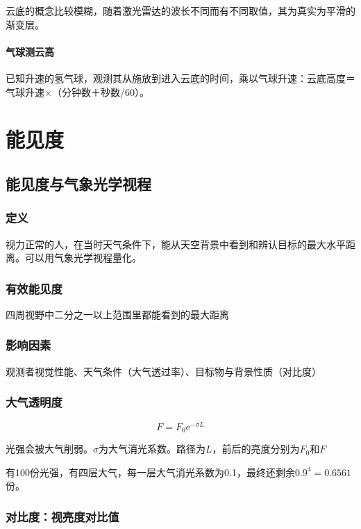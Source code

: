 \documentclass[UTF8,11pt]{ctexbook}
\begin{document}
云底的概念比较模糊，随着激光雷达的波长不同而有不同取值，其为真实为平滑的渐变层。 

\subsubsection{气球测云高}

已知升速的氢气球，观测其从施放到进入云底的时间，乘以气球升速：云底高度＝气球升速×（分钟数＋秒数/60）。

\chapter{能见度}

\section{能见度与气象光学视程}

\subsection{定义}

视力正常的人，在当时天气条件下，能从天空背景中看到和辨认目标的最大水平距离。可以用气象光学视程量化。

\subsection{有效能见度}

四周视野中二分之一以上范围里都能看到的最大距离

\subsection{影响因素}

观测者视觉性能、天气条件（大气透过率）、目标物与背景性质（对比度）

\subsection{大气透明度}
\[
F=F_0\mathrm{e}^{-\sigma L}
\]

光强会被大气削弱。\(\sigma\)为大气消光系数。路径为\(L\)，前后的亮度分别为\(F_0\)和\(F\)

有100份光强，有四层大气，每一层大气消光系数为0.1，最终还剩余\(0.9^4=0.6561\)份。

\subsection{对比度：视亮度对比值}
\end{document}
